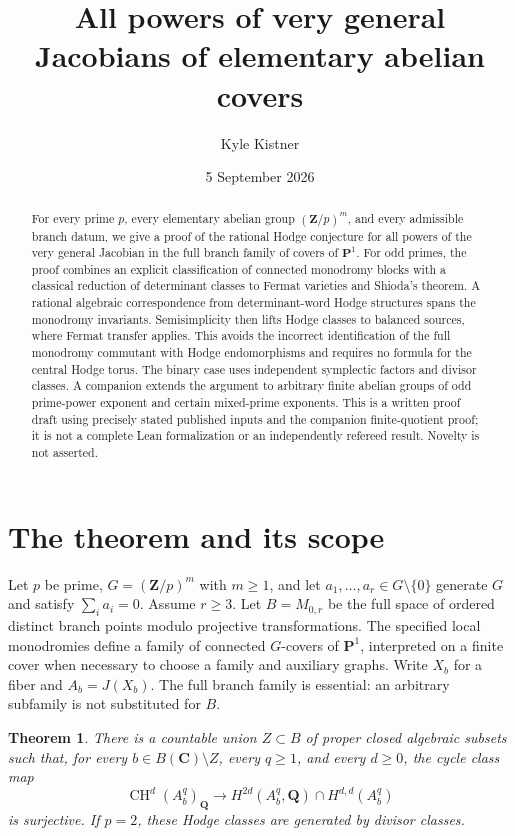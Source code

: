 \documentclass[11pt]{article}
\title{All powers of very general Jacobians of elementary abelian covers}
\author{Kyle Kistner}
\date{5 September 2026}
\newtheorem{theorem}{Theorem}[section]
\theoremstyle{definition}
\newcommand{\Q}{\mathbf Q}
\newcommand{\C}{\mathbf C}
\newcommand{\Z}{\mathbf Z}
\newcommand{\CH}{\operatorname{CH}}
\begin{document}
\maketitle
\begin{abstract}
For every prime $p$, every elementary abelian group $(\Z/p)^m$, and every
 admissible branch datum, we give a proof of the rational Hodge conjecture
 for all powers of the very general Jacobian in the full branch family of
 covers of $\mathbf P^1$. For odd primes, the proof combines
 an explicit classification of connected monodromy blocks with a classical
 reduction of determinant classes to Fermat varieties and Shioda's theorem.
 A rational
 algebraic correspondence from determinant-word Hodge structures spans the
 monodromy invariants. Semisimplicity then lifts Hodge classes to balanced
 sources, where Fermat transfer applies. This avoids the incorrect identification of
 the full monodromy commutant with Hodge endomorphisms and requires no formula
 for the central Hodge torus. The binary case uses independent symplectic
 factors and divisor classes. A companion extends the argument to arbitrary
 finite abelian groups of odd prime-power exponent and certain mixed-prime
 exponents. This is a written proof draft using precisely
 stated published inputs and the companion finite-quotient proof; it is not a complete
 Lean formalization or an independently refereed result. Novelty is not asserted.
\end{abstract}

\section{The theorem and its scope}\label{sec:scope}
Let $p$ be prime, $G=(\Z/p)^m$ with $m\geq1$, and let
$a_1,\ldots,a_r\in G\setminus\{0\}$ generate $G$ and satisfy
$\sum_i a_i=0$. Assume $r\geq3$. Let $B=M_{0,r}$ be the full space of
ordered distinct branch points modulo projective transformations. The
specified local monodromies define a family of connected $G$-covers of
$\mathbf P^1$, interpreted on a finite cover when necessary to choose a
family and auxiliary graphs. Write $X_b$ for a fiber and $A_b=J(X_b)$.
The full branch family is essential: an arbitrary subfamily is not substituted
for $B$.

\begin{theorem}\label{thm:main}
There is a countable union $Z\subset B$ of proper closed algebraic subsets
such that, for every $b\in B(\C)\setminus Z$, every $q\geq1$, and every
$d\geq0$, the cycle class map
\[
 \CH^d(A_b^q)_\Q\longrightarrow
 H^{2d}(A_b^q,\Q)\cap H^{d,d}(A_b^q)
\]
is surjective. If $p=2$, these Hodge classes are generated by divisor classes.
\end{theorem}
\end{document}

